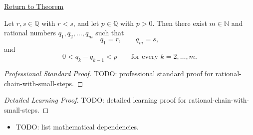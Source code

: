 \newpage
{}
\label{prf:rational-chain-with-small-steps}

\begin{remark*}[Return]
\hyperref[thm:rational-chain-with-small-steps]{Return to Theorem}
\end{remark*}

\begin{theorem*}
Let $r,s\in\mathbb{Q}$ with $r<s$, and let $p\in\mathbb{Q}$ with $p>0$.
Then there exist $m\in\mathbb{N}$ and rational numbers
$q_1,q_2,\dots,q_m$ such that
\[
q_1=r,\qquad q_m=s,
\]
and
\[
0<q_k-q_{k-1}<p
\qquad\text{for every }k=2,\dots,m.
\]
\end{theorem*}

\begin{proof}[Professional Standard Proof]
\LRAProofBodyStart
TODO: professional standard proof for rational-chain-with-small-steps.
\end{proof}

\begin{proof}[Detailed Learning Proof]
\LRAProofBodyStart
TODO: detailed learning proof for rational-chain-with-small-steps.
\end{proof}

\begin{remark*}
\end{remark*}

\begin{dependencies}
\begin{itemize}
  \item TODO: list mathematical dependencies.
\end{itemize}
\end{dependencies}

\clearpage
